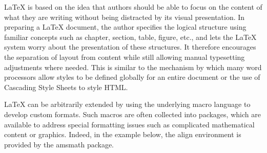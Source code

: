 LaTeX is based on the idea that authors should be able to focus on the content of what they are writing without being distracted by its visual presentation. In preparing a LaTeX document, the author specifies the logical structure using familiar concepts such as chapter, section, table, figure, etc., and lets the LaTeX system worry about the presentation of these structures. It therefore encourages the separation of layout from content while still allowing manual typesetting adjustments where needed. This is similar to the mechanism by which many word processors allow styles to be defined globally for an entire document or the use of Cascading Style Sheets to style HTML.\newline

LaTeX can be arbitrarily extended by using the underlying macro language to develop custom formats. Such macros are often collected into packages, which are available to address special formatting issues such as complicated mathematical content or graphics. Indeed, in the example below, the align environment is provided by the amsmath package.